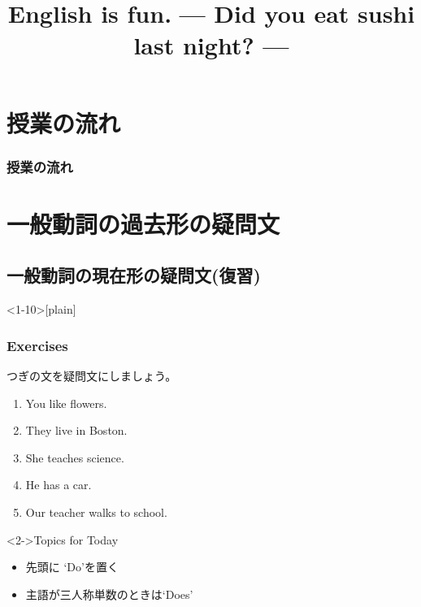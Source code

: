 \documentclass[aspectratio=169,xcolor={dvipsnames,table}]{beamer}
\title{English is fun.\,\,{}--- Did you eat sushi last night? ---}
\author{}
\institute[]{}
\date[]
\newcommand{\myaudio}[1]{\href{#1}{\faVolumeUp}}
\begin{document}
\begin{frame}[plain]
  \titlepage
\end{frame}

\section*{授業の流れ}
\begin{frame}[plain]
  \frametitle{授業の流れ}
  \tableofcontents
\end{frame}

\section{一般動詞の過去形の疑問文}
\subsection{一般動詞の現在形の疑問文(復習)}
 
\begin{frame}<1-10>[plain]\frametitle{Exercises}

つぎの文を疑問文にしましょう。

 \begin{enumerate}
  \item<1-> You like flowers.\hspace{59.7pt}
  \item<1-> They live in Boston.\hspace{47.5pt}%
  \item<1-> She teaches science.\hspace{42pt}%
  \item<1-> He has  a car.\hspace{80.5pt}%
  \item<1-> Our teacher walks to school.
 \end{enumerate}

\begin{exampleblock}<2->{Topics for Today}
\begin{itemize}\small
 \item<3->   先頭に `Do'を置く\pause
 \item<4->   主語が三人称単数のときは`Does'
\end{itemize}
\end{exampleblock}
\vspace{-10pt}
%
 \mbox{}\hfill\myaudio{./audio/027_past_did_you_01.mp3}

\end{frame}
\end{document}
